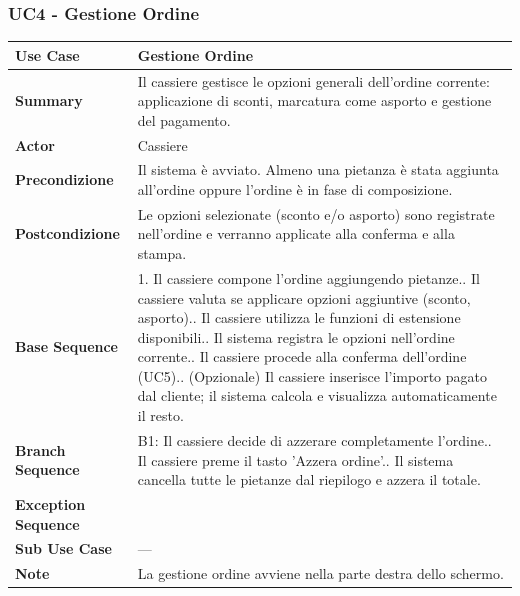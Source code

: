 \subsubsection*{UC4 - Gestione Ordine}
\begin{center}
\begin{tabular}{|p{}|p{}|}
\hline
\textbf{Use Case} & Gestione Ordine \\ \hline
\textbf{Summary} & Il cassiere gestisce le opzioni generali dell'ordine corrente: applicazione di sconti, marcatura come asporto e gestione del pagamento. \\ \hline
\textbf{Actor} & Cassiere \\ \hline
\textbf{Precondizione} & Il sistema è avviato. Almeno una pietanza è stata aggiunta all'ordine oppure l'ordine è in fase di composizione. \\ \hline
\textbf{Postcondizione} & Le opzioni selezionate (sconto e/o asporto) sono registrate nell'ordine e verranno applicate alla conferma e alla stampa. \\ \hline
\textbf{Base Sequence} & 1. Il cassiere compone l'ordine aggiungendo pietanze.\newline 2. Il cassiere valuta se applicare opzioni aggiuntive (sconto, asporto).\newline 3. Il cassiere utilizza le funzioni di estensione disponibili.\newline 4. Il sistema registra le opzioni nell'ordine corrente.\newline 5. Il cassiere procede alla conferma dell'ordine (UC5).\newline 6. (Opzionale) Il cassiere inserisce l'importo pagato dal cliente; il sistema calcola e visualizza automaticamente il resto. \\ \hline
\textbf{Branch Sequence} & B1: Il cassiere decide di azzerare completamente l'ordine.\newline 2. Il cassiere preme il tasto 'Azzera ordine'.\newline 3. Il sistema cancella tutte le pietanze dal riepilogo e azzera il totale. \\ \hline
\textbf{Exception Sequence} & \\ \hline
\textbf{Sub Use Case} & — \\ \hline
\textbf{Note} & La gestione ordine avviene nella parte destra dello schermo. \\ \hline
\end{tabular}
\end{center}

